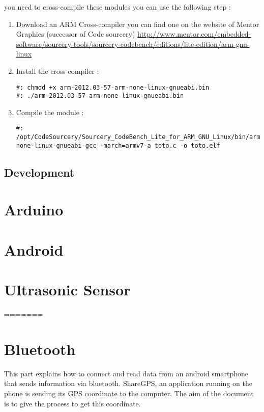 you need to cross-compile these modules you can use the following step :
\begin{enumerate}
\item Download an ARM Cross-compiler you can find one on the website of Mentor Graphics (successor of Code sourcery) 
\url{http://www.mentor.com/embedded-software/sourcery-tools/sourcery-codebench/editions/lite-edition/arm-gnu-linux}
\item Install the cross-compiler :

\begin{lstlisting}
#: chmod +x arm-2012.03-57-arm-none-linux-gnueabi.bin
#: ./arm-2012.03-57-arm-none-linux-gnueabi.bin
\end{lstlisting}
\item Compile the module :
\begin{lstlisting}
#: /opt/CodeSourcery/Sourcery_CodeBench_Lite_for_ARM_GNU_Linux/bin/arm-none-linux-gnueabi-gcc -march=armv7-a toto.c -o toto.elf
\end{lstlisting}

\end{enumerate}

\subsection{Development}

\section{Arduino}

\section{Android}

\section{Ultrasonic Sensor}
=======
\section{Bluetooth}

This part explains how to connect and read data from an android smartphone that sends information via bluetooth. ShareGPS, an application running on the phone is sending its GPS coordinate to the computer. The aim of the document is to give the process to get this coordinate.\\

